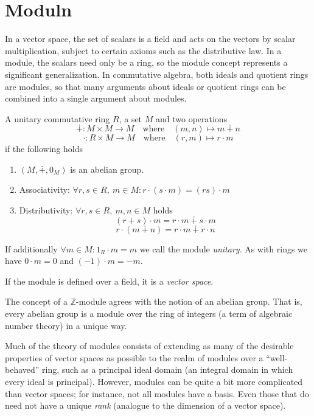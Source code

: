 \section{Moduln}
In a vector space, the set of scalars is a field and acts on the vectors by scalar multiplication, subject to certain axioms such as the distributive law.
In a module, the scalars need only be a ring, so the module concept represents a significant generalization.
In commutative algebra, both ideals and quotient rings are modules, so that many arguments about ideals or quotient rings can be combined into a single argument about modules.

\begin{definition}[R-Module]
   A unitary commutative ring \(R\), a set \(M\) and two operations
   \[\dotplus: M \times M \to M \quad\text{where}\quad (m, n) \mapsto m \dotplus n\]
   \[\cdot: R \times M \to M \quad\text{where}\quad (r, m) \mapsto r \cdot m\]
   if the following holds
   \begin{enumerate}[label=\roman*, align=Center]
      \item \((M, \dotplus, 0_M)\) is an abelian group.
      \item Associativity: \(\forall r, s \in R,~m \in M: r \cdot (s \cdot m) = (rs) \cdot m\)
      \item Distributivity: \(\forall r, s \in R,~m,n \in M\) holds
         \[(r + s) \cdot m = r \cdot m \dotplus s \cdot m\]
         \[r \cdot (m \dotplus n) = r \cdot m \dotplus r \cdot n\]
   \end{enumerate}
\end{definition}
\begin{remark}
   If additionally \(\forall m \in M: 1_R \cdot m = m\) we call the module \emph{unitary}.
   As with rings we have \(0 \cdot m = 0\) and \((-1) \cdot m = -m\).
\end{remark}
\begin{remark}
   If the module is defined over a field, it is a \emph{vector space}.
\end{remark}
\begin{example}
   The concept of a \(\mathbb{Z}\)-module agrees with the notion of an abelian group.
   That is, every abelian group is a module over the ring of integers (a term of algebraic number theory) in a unique way.
\end{example}

Much of the theory of modules consists of extending as many of the desirable properties of vector spaces as possible to the realm of modules over a ``well-behaved'' ring, such as a principal ideal domain (an integral domain in which every ideal is principal).
However, modules can be quite a bit more complicated than vector spaces; for instance, not all modules have a basis.
Even those that do need not have a unique \emph{rank} (analogue to the dimension of a vector space).


